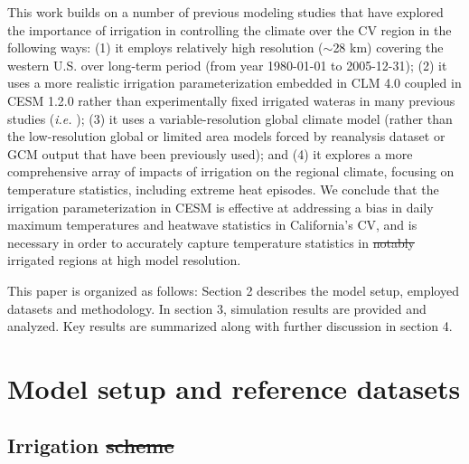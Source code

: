 \documentclass[draft,ms]{agutex}   %
\providecommand{\DIFadd}[1]{{\protect\color{blue}\uwave{#1}}} %
\providecommand{\DIFdel}[1]{{\protect\color{red}\sout{#1}}}                      %
\providecommand{\DIFaddbegin}{} %
\providecommand{\DIFaddend}{} %
\providecommand{\DIFdelbegin}{} %
\providecommand{\DIFdelend}{} %
\begin{document}
\begin{article}
This work builds on a number of previous modeling studies that have explored the importance of irrigation in controlling the climate over the CV region in the following ways: (1) it employs relatively high resolution ($\sim$28 km) covering the western U.S. over long-term period  (from year 1980-01-01 to 2005-12-31); (2) it uses a more realistic irrigation parameterization embedded in CLM 4.0 \DIFaddbegin \DIFadd{and }\DIFaddend coupled in CESM 1.2.0 rather than experimentally fixed irrigated water\DIFaddbegin \DIFadd{, }\DIFaddend as in many previous studies (\textit{i.e.} \cite{lobell2006biogeophysical, lo2013irrigation}); (3) it uses a variable-resolution global climate model (rather than the low-resolution global or limited area models forced by reanalysis dataset or GCM output that have been previously used); and (4) it explores a more comprehensive array of impacts of irrigation on the regional climate, focusing on temperature statistics, including extreme heat episodes.  We conclude that the irrigation parameterization in CESM is effective at addressing a bias in daily maximum temperatures and heatwave statistics in California's CV, and is necessary in order to accurately capture temperature statistics in \DIFdelbegin \DIFdel{notably }\DIFdelend \DIFaddbegin \DIFadd{heavily }\DIFaddend irrigated regions at high model resolution.

This paper is organized as follows: Section 2 describes the model setup, employed datasets and methodology. In section 3, simulation results are provided and analyzed. Key results are summarized along with further discussion in section 4.

\section{Model setup and reference datasets}

\subsection{Irrigation \DIFdelbegin \DIFdel{scheme}\DIFdelend \DIFaddbegin \DIFadd{parameterization}\DIFaddend }


\end{article}
\end{document}
